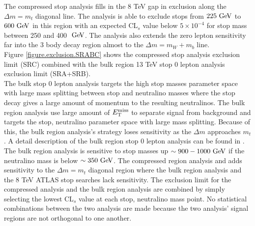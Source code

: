 \indent  The compressed stop analysis fills in the 8 TeV gap in exclusion along the $\Delta m = m_{t}$ diagonal line.  The analysis is able to exclude stops from $225 \gev$ to $600 \gev$ in this region with an expected CL$_s$ value below $5\times 10^{-4}$ for stop mass between 250 and 400 $\gev$.  The analysis also extends the zero lepton sensitivity far into the 3 body decay region almost to the $\Delta m = m_{W}+m_{b}$ line. \\

\indent Figure \ref{figure.exclusion.SRABC} shows the compressed stop analysis exclusion limit (SRC) combined with the bulk region 13 TeV stop 0 lepton analysis exclusion limit (SRA+SRB).  \\

\indent The bulk stop 0 lepton analysis targets the high stop masses parameter space with large mass splitting between stop and neutralino masses where the stop decay gives a large amount of momentum to the resulting neutralinos.  The bulk region analysis use large amount of $E_{\mathrm{T}}^{\mathrm{miss}}$ to separate signal from background and targets the stop, neutralino parameter space with large mass splitting.   Because of this, the bulk region analysis's strategy loses sensitivity as the $\Delta m$ approaches $m_{t}$.  A detail description of the bulk region stop 0 lepton analysis can be found in \cite{stop0Lmoriond}.  \\

\indent The bulk region analysis is sensitive to stop masses up $\sim900-1000 \gev$ if the neutralino mass is below $\sim350 \gev$. The compressed region analysis and adds sensitivity to the $\Delta m = m_{t}$ diagonal region where the bulk region analysis and the 8 TeV ATLAS stop searches lack sensitivity.  The exclusion limit for the compressed analysis and the bulk region analysis are combined by simply selecting the lowest CL$_s$ value at each stop, neutralino mass point.  No statistical combinations between the two analysis are made because the two analysis' signal regions are not orthogonal to one another. \\


